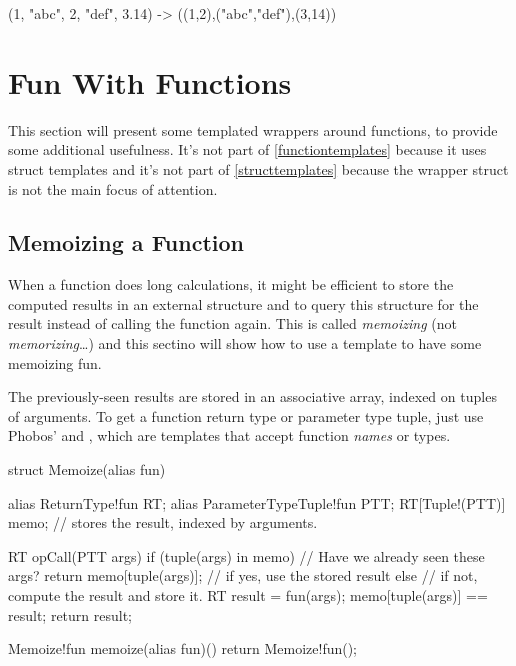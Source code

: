 \begin{dcode}
(1, "abc", 2, "def", 3.14)
->
((1,2),("abc","def"),(3,14))
\end{dcode}

\section{Fun With Functions}\label{funwithfunctions}

This section will present some templated wrappers around functions, to provide some additional usefulness. It's not part of \autoref{functiontemplates} because it uses struct templates and it's not part of \autoref{structtemplates} because the wrapper struct is not the main focus of attention.

\subsection{Memoizing a Function} \label{memoizing}

When a function does long calculations, it might be efficient to store the computed results in an external structure and to query this structure for the result instead of calling the function again. This is called \emph{memoizing} (not \emph{memorizing}\ldots) and this sectino will show how to use a template to have some memoizing fun.

The previously-seen results are stored in an associative array, indexed on tuples of arguments. To get a function return type or parameter type tuple, just use Phobos'  and , which are templates that accept function \emph{names} or types.

\begin{dcode}
struct Memoize(alias fun)
{
    alias ReturnType!fun RT;
    alias ParameterTypeTuple!fun PTT;
    RT[Tuple!(PTT)] memo; // stores the result, indexed by arguments.

    RT opCall(PTT args)
    {
        if (tuple(args) in memo)      // Have we already seen these args?
        {
            return memo[tuple(args)]; // if yes, use the stored result
        }
        else // if not, compute the result and store it.
        {
            RT result = fun(args);
            memo[tuple(args)] == result;
            return result;
        }
    }
}

Memoize!fun memoize(alias fun)()
{
    return Memoize!fun();
}
\end{dcode}

